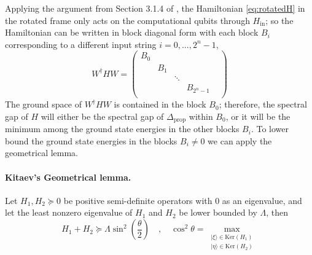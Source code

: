 \documentclass[11pt,letterpaper]{article}
\theoremstyle{definition}
\theoremstyle{remark}
\numberwithin{equation}{section}
\let\origparagraph\paragraph
\renewcommand{\paragraph}[1]{\origparagraph{#1.}}
\theoremstyle{definition}
\newcommand{\ket}[1]{|#1\rangle}
\begin{document}
Applying the argument from Section 3.1.4 of \cite{aharonov2008adiabatic}, the Hamiltonian \eqref{eq:rotatedH} in the rotated frame only acts on the computational qubits through $H_\textrm{in}$; so the Hamiltonian can be written in block diagonal form with each block $B_i$ corresponding to a different input string $i = 0,...,2^n -1$,
\begin{equation}
W^\dagger H W = \left( \begin{array}{ccccc}
B_0 &  &  &  &  \\
 & B_1 &  &  &  \\
 &  & \ddots & &  \\
 &  &  & B_{2^n -1}&  \\
\end{array} \right)
\end{equation}
The ground space of $W^\dagger H W$ is contained in the block $B_0$; therefore, the spectral gap of $H$ will either be the spectral gap of $\Delta_{\textrm{prop}}$ within $B_0$, or it will be the minimum among the ground state energies in the other blocks $B_i$.  To lower bound the ground state energies in the blocks $B_i \neq 0$ we can apply the geometrical lemma. 

\paragraph{Kitaev's Geometrical lemma}  Let $H_1, H_2 \succeq 0$ be positive semi-definite operators with 0 as an eigenvalue, and let the least nonzero eigenvalue of $H_1$ and $H_2$ be lower bounded by $\Lambda$, then
\begin{equation}
H_1 + H_2 \succeq \Lambda \sin^2\left(\frac{\theta}{2}\right) \quad , \quad \cos^2 \theta = \max_{\substack{\ket{\xi}\in \textrm{Ker}(H_1) \\ |\eta \rangle \in \textrm{Ker}(H_2)}}
\end{equation}
\end{document}
